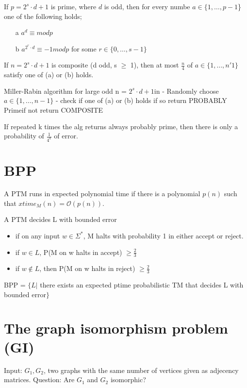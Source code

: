 \documentclass[a4paper,12pt]{article}
\theoremstyle{definition}
\theoremstyle{remark}
\begin{document}
If $p = 2^s \cdot d + 1$ is prime, where $d$ is odd, then for every numbe $a \in \{1, \dots, p-1$\}  one of the following holds;
\begin{itemize}
    \item[a] $a^d \equiv mod p$
    \item[b] $a^{2^r \cdot d} \equiv -1 mod p$ for some $r \in \{0, \dots, s-1\}$
\end{itemize}

If $n = 2^s \cdot d + 1$ is composite (d odd, s $\geq$ 1), then at most $\frac{n}{4}$ of $a \in \{1, \dots, n'1\}$ satisfy one of (a) or (b) holds.

Miller-Rabin algorithm for large odd n = $2^s \cdot d + 1$in 
- Randomly choose $a \in \{1, \dots, n-1\}$
- check if one of (a) or (b) holds
if so return PROBABLY Primeif not return COMPOSITE

If repeated k times the alg returns always probably prime, then there is only a probability of $\frac{1}{4^k}$ of error.

\section{BPP}

A PTM runs in expected polynomial time if there is a polynomial $p(n)$ such that $xtime_M(n) = \mathscr{O}(p(n))$.

A PTM decides L with bounded error
\begin{itemize}
    \item if on any input $w \in \Sigma^*$, M halts with probability 1 in either accept or reject.
    \item if $w \in L$, P(M on w halts in accept) $\geq \frac{2}{3}$
    \item if $w \notin L$, then P(M on w halts in reject) $\geq \frac{2}{3}$
\end{itemize}

BPP = $\{L | $ there exists an expected ptime probabilistic TM that decides L with bounded error$\}$







\newpage

\section{The graph isomorphism problem (GI)}

Input: $G_1, G_2$, two graphs with the same number of vertices given as adjecency matrices.
Question: Are $G_1$ and $G_2$ isomorphic?
\end{document}
